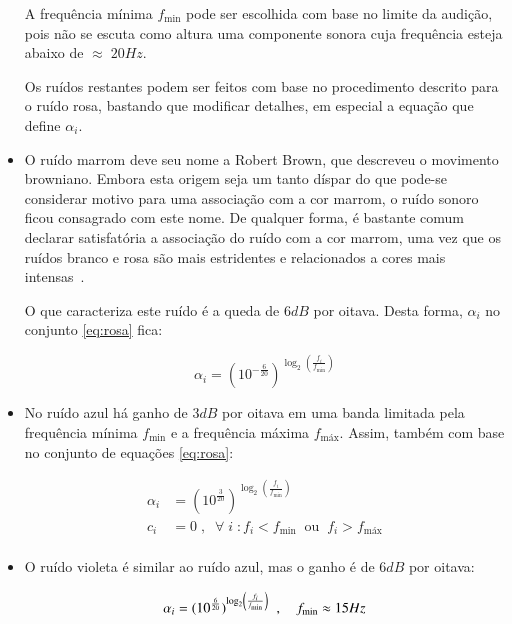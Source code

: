 \begin{itemize}
A frequência mínima $f_{\text{min}}$ pode ser escolhida com base no limite da audição, pois não se escuta como altura uma componente sonora cuja frequência esteja abaixo de $\approx\; 20Hz$.

Os ruídos restantes podem ser feitos com base no procedimento descrito para 
o ruído rosa, bastando que modificar detalhes, em especial a equação que define $\alpha_i$.

\item O ruído marrom deve seu nome a Robert Brown, que descreveu o movimento browniano.
Embora esta origem seja um tanto díspar do que pode-se considerar motivo para uma associação com a cor marrom, o ruído sonoro ficou consagrado com este nome. De qualquer forma, é bastante comum declarar satisfatória a associação do ruído com a cor marrom, uma vez que os ruídos branco e rosa são mais estridentes e relacionados a cores mais intensas~\cite{marrom}.

O que caracteriza este ruído é a queda de $6dB$ por oitava. Desta forma, $\alpha_i$ 
no conjunto \ref{eq:rosa} fica:

\begin{equation}\label{eq:marrom}
\alpha_i=(10^{-\frac{6}{20}})^{\log _2 \left( \frac{f_i}{f_{\text{min}}} \right )}
\end{equation}

\item No ruído azul há ganho de $3dB$ por oitava em uma banda limitada
pela frequência mínima $f_{\text{min}}$ e a frequência
máxima $f_{\text{máx}}$. Assim, também com base no conjunto de equações \ref{eq:rosa}:

\begin{equation}\label{eq:azul}
\begin{split}
\alpha_i & = (10^{\frac{3}{20}})^{\log _2 \left ( \frac{f_i}{f_{\text{min}}} \right )} \\
c_i & =0\;,\;\; \forall \; i \; : f_i<f_{\text{min}} \;\; \text{ou} \;\; f_i>f_{\text{máx}} \\
\end{split}
\end{equation}

\item O ruído violeta é similar ao ruído azul, mas o ganho é de $6dB$ por oitava:

\begin{equation}\label{eq:violeta}
\alpha_i = (10^{\frac{6}{20}})^{\log _2 \left ( \frac{f_i}{f_{\text{min}}} \right )} \;\;, \quad f_{\text{min}} \approx 15 Hz \\
\end{equation}


\end{itemize}
